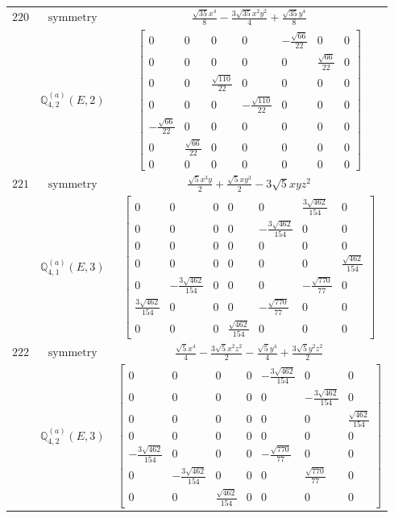 \documentclass[fleqn,8pt,landscape]{jsarticle}
\begin{document}
\begin{longtable}{ccc}
$ 220 $ & $ \text{symmetry} $ & $ \frac{\sqrt{35} x^{4}}{8} - \frac{3 \sqrt{35} x^{2} y^{2}}{4} + \frac{\sqrt{35} y^{4}}{8} $ \\
$  $ & $ \mathbb{Q}_{4,2}^{(a)}(E,2) $ & $ \begin{bmatrix} 0 & 0 & 0 & 0 & - \frac{\sqrt{66}}{22} & 0 & 0 \\ 0 & 0 & 0 & 0 & 0 & \frac{\sqrt{66}}{22} & 0 \\ 0 & 0 & \frac{\sqrt{110}}{22} & 0 & 0 & 0 & 0 \\ 0 & 0 & 0 & - \frac{\sqrt{110}}{22} & 0 & 0 & 0 \\ - \frac{\sqrt{66}}{22} & 0 & 0 & 0 & 0 & 0 & 0 \\ 0 & \frac{\sqrt{66}}{22} & 0 & 0 & 0 & 0 & 0 \\ 0 & 0 & 0 & 0 & 0 & 0 & 0 \end{bmatrix} $ \\ \hline
$ 221 $ & $ \text{symmetry} $ & $ \frac{\sqrt{5} x^{3} y}{2} + \frac{\sqrt{5} x y^{3}}{2} - 3 \sqrt{5} x y z^{2} $ \\
$  $ & $ \mathbb{Q}_{4,1}^{(a)}(E,3) $ & $ \begin{bmatrix} 0 & 0 & 0 & 0 & 0 & \frac{3 \sqrt{462}}{154} & 0 \\ 0 & 0 & 0 & 0 & - \frac{3 \sqrt{462}}{154} & 0 & 0 \\ 0 & 0 & 0 & 0 & 0 & 0 & 0 \\ 0 & 0 & 0 & 0 & 0 & 0 & \frac{\sqrt{462}}{154} \\ 0 & - \frac{3 \sqrt{462}}{154} & 0 & 0 & 0 & - \frac{\sqrt{770}}{77} & 0 \\ \frac{3 \sqrt{462}}{154} & 0 & 0 & 0 & - \frac{\sqrt{770}}{77} & 0 & 0 \\ 0 & 0 & 0 & \frac{\sqrt{462}}{154} & 0 & 0 & 0 \end{bmatrix} $ \\ \hline
$ 222 $ & $ \text{symmetry} $ & $ \frac{\sqrt{5} x^{4}}{4} - \frac{3 \sqrt{5} x^{2} z^{2}}{2} - \frac{\sqrt{5} y^{4}}{4} + \frac{3 \sqrt{5} y^{2} z^{2}}{2} $ \\
$  $ & $ \mathbb{Q}_{4,2}^{(a)}(E,3) $ & $ \begin{bmatrix} 0 & 0 & 0 & 0 & - \frac{3 \sqrt{462}}{154} & 0 & 0 \\ 0 & 0 & 0 & 0 & 0 & - \frac{3 \sqrt{462}}{154} & 0 \\ 0 & 0 & 0 & 0 & 0 & 0 & \frac{\sqrt{462}}{154} \\ 0 & 0 & 0 & 0 & 0 & 0 & 0 \\ - \frac{3 \sqrt{462}}{154} & 0 & 0 & 0 & - \frac{\sqrt{770}}{77} & 0 & 0 \\ 0 & - \frac{3 \sqrt{462}}{154} & 0 & 0 & 0 & \frac{\sqrt{770}}{77} & 0 \\ 0 & 0 & \frac{\sqrt{462}}{154} & 0 & 0 & 0 & 0 \end{bmatrix} $ \\ \hline

\end{longtable}
\end{document}
